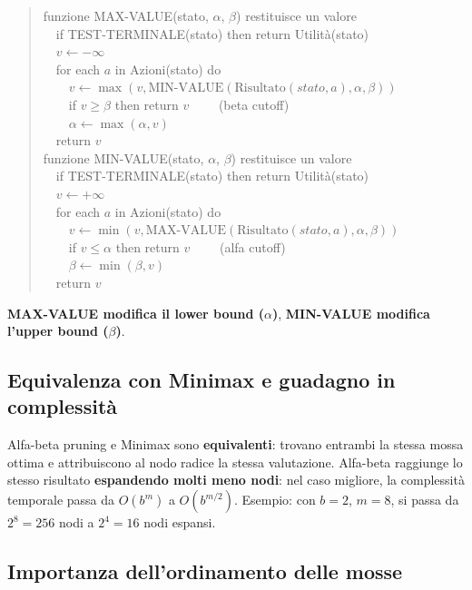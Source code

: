 \documentclass[11pt,a4paper]{report}
\begin{document}
\begin{quote}
\ttfamily
funzione MAX-VALUE(stato, $\alpha$, $\beta$) restituisce un valore\\
\ \ if TEST-TERMINALE(stato) then return Utilità(stato)\\
\ \ $v \leftarrow -\infty$\\
\ \ for each $a$ in Azioni(stato) do\\
\ \ \ \ $v \leftarrow \max(v, \text{MIN-VALUE}(\text{Risultato}(stato,a),\alpha,\beta))$\\
\ \ \ \ if $v \ge \beta$ then return $v$ \ \ \ \ (beta cutoff)\\
\ \ \ \ $\alpha \leftarrow \max(\alpha, v)$\\
\ \ return $v$\\[4pt]
funzione MIN-VALUE(stato, $\alpha$, $\beta$) restituisce un valore\\
\ \ if TEST-TERMINALE(stato) then return Utilità(stato)\\
\ \ $v \leftarrow +\infty$\\
\ \ for each $a$ in Azioni(stato) do\\
\ \ \ \ $v \leftarrow \min(v, \text{MAX-VALUE}(\text{Risultato}(stato,a),\alpha,\beta))$\\
\ \ \ \ if $v \le \alpha$ then return $v$ \ \ \ \ (alfa cutoff)\\
\ \ \ \ $\beta \leftarrow \min(\beta, v)$\\
\ \ return $v$
\end{quote}

\textbf{MAX-VALUE modifica il lower bound ($\alpha$)}, \textbf{MIN-VALUE modifica l'upper bound ($\beta$)}.

\subsection*{Equivalenza con Minimax e guadagno in complessità}

Alfa-beta pruning e Minimax sono \textbf{equivalenti}: trovano entrambi la stessa mossa ottima e attribuiscono al nodo radice la stessa valutazione. Alfa-beta raggiunge lo stesso risultato \textbf{espandendo molti meno nodi}: nel caso migliore, la complessità temporale passa da $O(b^m)$ a $O(b^{m/2})$. Esempio: con $b=2$, $m=8$, si passa da $2^8=256$ nodi a $2^4=16$ nodi espansi.

\subsection*{Importanza dell'ordinamento delle mosse}
\end{document}
